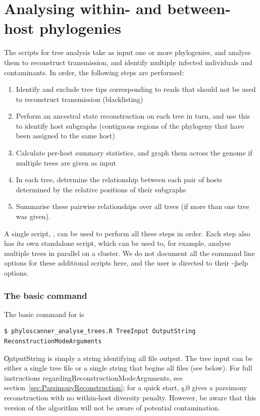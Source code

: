 \part{Analysing within- and between-host phylogenies}

The scripts for tree analysis take as input one or more phylogenies, and analyse them to reconstruct transmission, and identify multiply infected individuals and contaminants.
In order, the following steps are performed:

\begin{enumerate}
\item  Identify and exclude tree tips corresponding to reads that should not be used to reconstruct transmission (blacklisting)
\item Perform an ancestral state reconstruction on each tree in turn, and use this to identify host subgraphs (contiguous regions of the phylogeny that have been assigned to the same host)
\item Calculate per-host summary statistics, and graph them across the genome if multiple trees are given as input
\item In each tree, determine the relationship between each pair of hosts determined by the relative positions of their subgraphs
\item Summarise these pairwise relationships over all trees (if more than one tree was given).
\end{enumerate}

A single script, \pat, can be used to perform all these steps in order.
Each step also has its own standalone script, which can be used to, for example, analyse multiple trees in parallel on a cluster.
We do not document all the command line options for these additional scripts here, and the user is directed to their \c{--help} options.

\section{The basic command}

The basic command for \pat is
\begin{verbatim}
$ phyloscanner_analyse_trees.R TreeInput OutputString ReconstructionModeArguments
\end{verbatim}
\c{OutputString} is simply a string identifying all file output.
The tree input can be either a single tree file or a single string that begins all files (see below).
For full instructions regarding\break \c{ReconstructionModeArguments}, see section~\ref{sec:ParsimonyReconstruction}; for a quick start, \c{s,0} gives a parsimony reconstruction with no within-host diversity penalty.
However, be aware that this version of the algorithm will not be aware of potential contamination.

